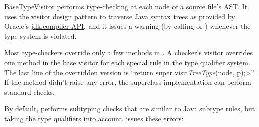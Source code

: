 BaseTypeVisitor performs type-checking at each node of a
source file's AST\@.  It uses the visitor design pattern to traverse
Java syntax trees as provided by Oracle's
\href{https://docs.oracle.com/en/java/javase/25/docs/api/jdk.compiler/module-summary.html}{jdk.compiler
API},
and it issues a warning (by calling
or
)
whenever the type system is violated.

Most type-checkers
override only a few methods in .
A checker's visitor overrides one method in the base visitor for each special
rule in the type qualifier system.
The last line of the overridden version is
``\<return super.visit\emph{TreeType}(node, p);>''.
If the method didn't raise any error,
the superclass implementation can perform standard checks.


By default,  performs subtyping checks that are
similar to Java subtype rules, but taking the type qualifiers into account.
 issues these errors:

